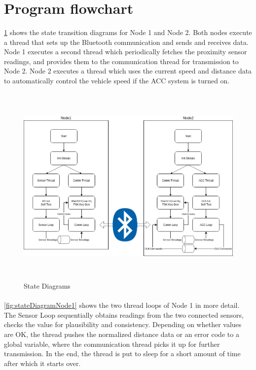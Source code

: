 \section{Program flowchart}
\label{chapter3}


\paragraph{}
\ref{fig:stateDiagrams} shows the state transition diagrams for Node 1 and Node 2. Both nodes execute a thread that sets up the Bluetooth communication and sends and receives data. Node 1 executes a second thread which periodically fetches the proximity sensor readings, and provides them to the communication thread for transmission to Node 2. Node 2 executes a thread which uses the current speed and distance data to automatically control the vehicle speed if the ACC system is turned on.

\begin{figure}[h]
	\includegraphics[height=100mm]{images/StateDiagrams.png}
	\centering
	\caption{State Diagrams}
	\label{fig:stateDiagrams}
\end{figure}

\paragraph{}
\ref{fig:stateDiagramNode1} shows the two thread loops of Node 1 in more detail. The Sensor Loop sequentially obtains readings from the two connected sensors, checks the value for plausibility and consistency. Depending on whether values are OK, the thread pushes the normalized distance data or an error code to a global variable, where the communication thread picks it up for further transmission. In the end, the thread is put to sleep for a short amount of time after which it starts over.

